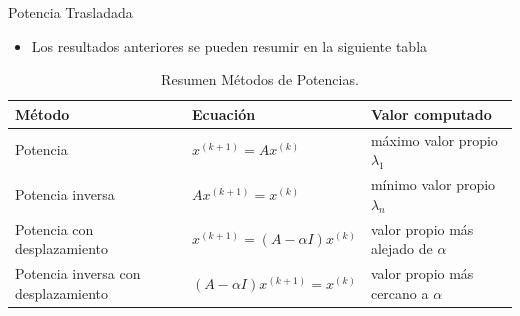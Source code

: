 \documentclass[11pt]{beamer}
\begin{document}
  \begin{frame}{Potencia Trasladada}
    \begin{itemize}
      \item Los resultados anteriores se pueden resumir en la siguiente tabla
\end{itemize}    
      \begin{table}[ht]
      \begin{center}
      \label{resum_potencia}
       \begin{tabular}{|p{3cm}|l|p{3cm}|}\hline
       \textbf{M\'etodo} & \textbf{Ecuaci\'on} & \textbf{Valor computado}\\\hline
        Potencia & $x^{(k+1)}=Ax^{(k)}$  & m\'aximo valor propio $\lambda_1$\\\hline
        Potencia inversa & $Ax^{(k+1)}=x^{(k)}$ & m\'inimo valor propio $\lambda_n$\\\hline
        Potencia con desplazamiento & $x^{(k+1)}=(A-\alpha I)x^{(k)}$ & valor propio m\'as alejado de $\alpha$\\\hline
        Potencia inversa con desplazamiento & $(A-\alpha I)x^{(k+1)}=x^{(k)}$ & valor propio m\'as cercano a $\alpha$\\\hline
      \end{tabular}
      \caption{Resumen M\'etodos de Potencias.}
      \end{center}
      \end{table}
  \end{frame}
\end{document}
